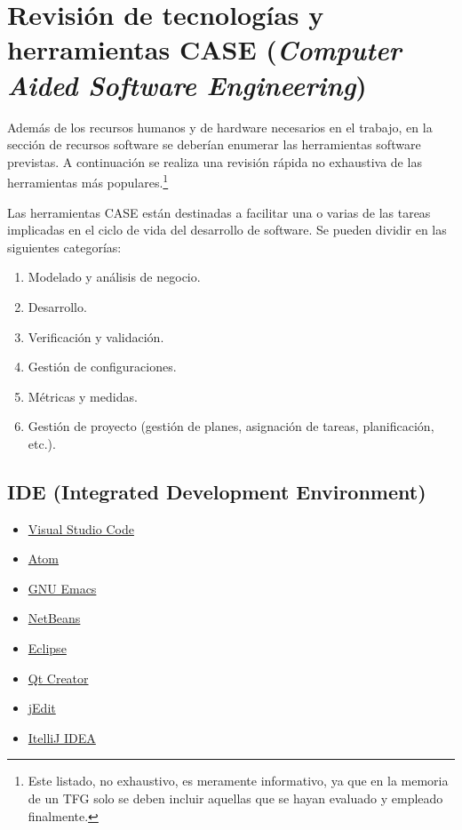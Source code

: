 \section[Tecnologías]{Revisión de tecnologías y herramientas CASE (\emph{Computer Aided Software Engineering})}
Además de los recursos humanos y de hardware necesarios en el trabajo, en la sección de recursos software se deberían enumerar las herramientas software previstas. A continuación se realiza una revisión rápida no exhaustiva de las herramientas más populares.\footnote{Este listado, no exhaustivo, es meramente informativo, ya que en la memoria de un TFG solo se deben incluir aquellas que se hayan evaluado y empleado finalmente.}

Las herramientas CASE están destinadas a facilitar una o varias de las tareas implicadas en el ciclo de vida del desarrollo de software. Se pueden dividir en las siguientes categorías:

\begin{enumerate}[noitemsep]
\item Modelado y análisis de negocio.
\item Desarrollo. 
\item Verificación y validación.
\item Gestión de configuraciones.
\item Métricas y medidas.
\item Gestión de proyecto (gestión de planes, asignación de tareas, planificación, etc.).
\end{enumerate}

\subsection{IDE (Integrated Development Environment)}
\begin{multicols}{2}
\begin{itemize}[nosep]
\item \href{https://code.visualstudio.com/}{Visual Studio Code}
\item \href{https://atom.io/}{Atom}
\item \href{https://www.gnu.org/s/emacs/}{GNU Emacs}
\item \href{https://netbeans.org/}{NetBeans}
\item \href{https://eclipse.org/}{Eclipse}
\item \href{https://www.qt.io/ide/}{Qt Creator}
\item \href{http://www.jedit.org/}{jEdit}
\item \href{https://www.jetbrains.com/idea/}{ItelliJ IDEA}
\end{itemize}
\end{multicols}

